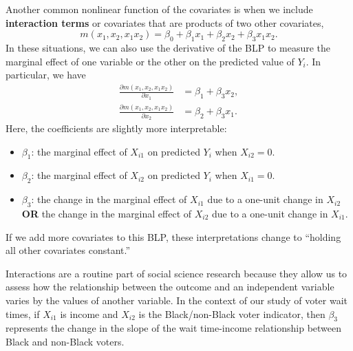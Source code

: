 \documentclass[
  letterpaper,
  DIV=11,
  numbers=noendperiod]{scrreprt}
\providecommand{\tightlist}{%
  \setlength{\itemsep}{0pt}\setlength{\parskip}{0pt}}\usepackage{longtable,booktabs,array}
\theoremstyle{definition}
\theoremstyle{definition}
\theoremstyle{plain}
\theoremstyle{remark}
\begin{document}
Another common nonlinear function of the covariates is when we include
\textbf{interaction terms} or covariates that are products of two other
covariates, \[ 
m(x_{1}, x_{2}, x_{1}x_{2}) = \beta_{0} + \beta_{1}x_{1} + \beta_{2}x_{2} + \beta_{3}x_{1}x_{2}.
\] In these situations, we can also use the derivative of the BLP to
measure the marginal effect of one variable or the other on the
predicted value of \(Y_i\). In particular, we have \[ 
\begin{aligned}
  \frac{\partial m(x_{1}, x_{2}, x_{1}x_{2})}{\partial x_1} &= \beta_1 + \beta_3x_2, \\
  \frac{\partial m(x_{1}, x_{2}, x_{1}x_{2})}{\partial x_2} &= \beta_2 + \beta_3x_1.
\end{aligned}
\] Here, the coefficients are slightly more interpretable:

\begin{itemize}
\tightlist
\item
  \(\beta_1\): the marginal effect of \(X_{i1}\) on predicted \(Y_i\)
  when \(X_{i2} = 0\).
\item
  \(\beta_2\): the marginal effect of \(X_{i2}\) on predicted \(Y_i\)
  when \(X_{i1} = 0\).
\item
  \(\beta_3\): the change in the marginal effect of \(X_{i1}\) due to a
  one-unit change in \(X_{i2}\) \textbf{OR} the change in the marginal
  effect of \(X_{i2}\) due to a one-unit change in \(X_{i1}\).
\end{itemize}

If we add more covariates to this BLP, these interpretations change to
``holding all other covariates constant.''

Interactions are a routine part of social science research because they
allow us to assess how the relationship between the outcome and an
independent variable varies by the values of another variable. In the
context of our study of voter wait times, if \(X_{i1}\) is income and
\(X_{i2}\) is the Black/non-Black voter indicator, then \(\beta_3\)
represents the change in the slope of the wait time-income relationship
between Black and non-Black voters.
\end{document}

